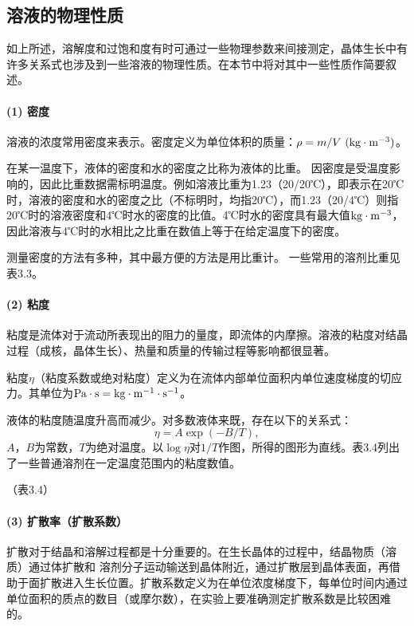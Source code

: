 ﻿\subsection{溶液的物理性质}
如上所述，溶解度和过饱和度有时可通过一些物理参数来间接测定，晶体生长中有许多关系式也涉及到一些溶液的物理性质。在本节中将对其中一些性质作简要叙述。

\paragraph{(1) 密度}
溶液的浓度常用密度来表示。密度定义为单位体积的质量：$\rho=m/V \ {\rm (kg\cdot m^{-3})}$。

在某一温度下，液体的密度和水的密度之比称为液体的比重。 因密度是受温度影响的，因此比重数据需标明温度。例如溶液比重为1.23（20/20℃），即表示在20℃时，溶液的密度和水的密度之比（不标明时，均指20℃），而1.23（20/4℃）则指20℃时的溶液密度和4℃时水的密度的比值。4℃时水的密度具有最大值${\rm kg\cdot m^{-3}}$，因此溶液与4℃时的水相比之比重在数值上等于在给定温度下的密度。

测量密度的方法有多种，其中最方便的方法是用比重计。 
一些常用的溶剂比重见表3.3。

\paragraph{(2) 粘度}
粘度是流体对于流动所表现出的阻力的量度，即流体的内摩擦。溶液的粘度对结晶过程（成核，晶体生长）、热量和质量的传输过程等影响都很显著。

粘度$\eta$（粘度系数或绝对粘度）定义为在流体内部单位面积内单位速度梯度的切应力。其单位为$\rm Pa\cdot s = kg\cdot m^{-1}\cdot s^{-1}$。

液体的粘度随温度升高而减少。对多数液体来既，存在以下的关系式：
\begin{equation}
\eta = A\exp{(-B/T)},
\end{equation}
$A$，$B$为常数，$T$为绝对温度。以$\log{\eta}$对$1/T$作图，所得的图形为直线。表3.4列出了一些普通溶剂在一定温度范围内的粘度数值。

（表3.4）

\paragraph{(3) 扩散率（扩散系数）}
扩散对于结晶和溶解过程都是十分重要的。在生长晶体的过程中，结晶物质（溶质）通过体扩散和 溶剂分子运动输送到晶体附近，通过扩散层到晶体表面，再借助于面扩散进入生长位置。扩散系数定义为在单位浓度梯度下，每单位时间内通过单位面积的质点的数目（或摩尔数），在实验上要准确测定扩散系数是比较困难的。

